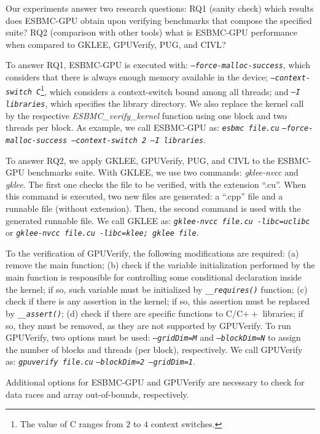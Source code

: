\documentclass[times, doublespace]{cpeauth}
\begin{document}
Our experiments answer two research questions: RQ1 (sanity check) which results does ESBMC-GPU obtain upon verifying benchmarks that compose the specified suite? RQ2 (comparison with other tools) what is ESBMC-GPU performance when compared to GKLEE, GPUVerify, PUG, and CIVL?

To answer RQ1, ESBMC-GPU is executed with: \emph{\tt --force-malloc-success}, which considers that there is always enough memory available in the device; \emph{\tt --context-switch C}\footnote{The value of C ranges from $2$ to $4$ context switches.}, which considers a context-switch bound among all threads; and \emph{\tt --I libraries}, which specifies the library directory. We also replace the kernel call by the respective \textit{ESBMC\_verify\_kernel} function using one block and two threads per block. As example, we call ESBMC-GPU as: \emph{\tt esbmc file.cu} \emph{\tt --force-malloc-success --context-switch 2 --I libraries}.

To answer RQ2, we apply GKLEE, GPUVerify, PUG, and CIVL to the ESBMC-GPU benchmarks suite. With GKLEE, we use two commands: \textit{gklee-nvcc} and \textit{gklee}. The first one checks the file to be verified, with the extension ``.cu''. When this command is executed, two new files are generated: a ``.cpp'' file and a runnable file (without extension). Then, the second command is used with the generated runnable file. We call GKLEE as: \emph{\tt gklee-nvcc file.cu -libc=uclibc} or \emph{\tt gklee-nvcc file.cu -libc=klee; gklee file}.

To the verification of GPUVerify, the following modifications are required: 
(a) remove the main function; 
(b) check if the variable initialization performed by the main function is responsible for controlling some conditional declaration inside the kernel; if so, such variable must be initialized by \emph{\tt \_\_requires()} function; 
(c) check if there is any assertion in the kernel; if so, this assertion must be replaced by \emph{\tt \_\_assert()}; 
(d) check if there are specific functions to C/C$++$ libraries; if so, they must be removed, as they are not supported by GPUVerify. 
To run GPUVerify, two options must be used: \emph{\tt --gridDim=M} and \emph{\tt --blockDim=N} to assign the number of blocks and threads (per block), respectively. We call GPUVerify as: \emph{\tt gpuverify file.cu} \emph{\tt --blockDim=2 --gridDim=1}. 

Additional options for ESBMC-GPU and GPUVerify are necessary to check for data races and array out-of-bounds, respectively.
\end{document}
